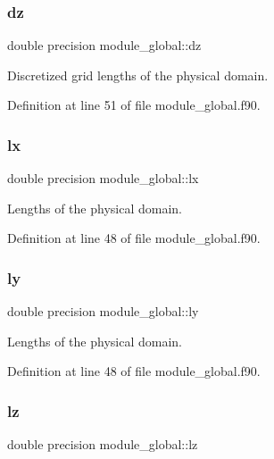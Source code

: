 \subsubsection{\texorpdfstring{dz}{dz}}
{\footnotesize\ttfamily double precision module\+\_\+global\+::dz}



Discretized grid lengths of the physical domain. 



Definition at line 51 of file module\+\_\+global.\+f90.

\mbox{\label{namespacemodule__global_a6ec7be7ac910713bd6e534fdf4f035f6}} 
\subsubsection{\texorpdfstring{lx}{lx}}
{\footnotesize\ttfamily double precision module\+\_\+global\+::lx}



Lengths of the physical domain. 



Definition at line 48 of file module\+\_\+global.\+f90.

\mbox{\label{namespacemodule__global_aea3b69a2a192a66afaa68c23a41a4c04}} 
\subsubsection{\texorpdfstring{ly}{ly}}
{\footnotesize\ttfamily double precision module\+\_\+global\+::ly}



Lengths of the physical domain. 



Definition at line 48 of file module\+\_\+global.\+f90.

\mbox{\label{namespacemodule__global_a6634b2eeafed254b5e008f5f0c8d2660}} 
\subsubsection{\texorpdfstring{lz}{lz}}
{\footnotesize\ttfamily double precision module\+\_\+global\+::lz}



